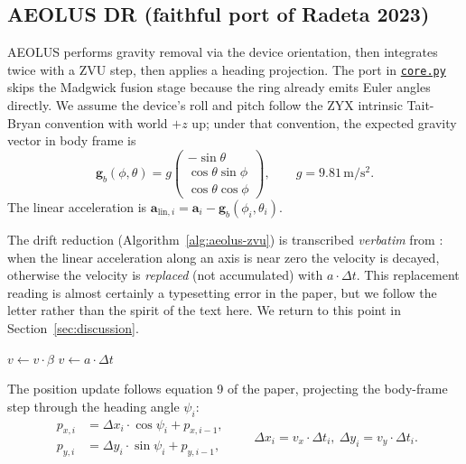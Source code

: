 \documentclass[a4paper,11pt]{article}
\begin{document}
\subsection{AEOLUS DR (faithful port of Radeta 2023)}

AEOLUS performs gravity removal via the device orientation, then integrates
twice with a ZVU step, then applies a heading projection. The port in
\href{../ringbrush_coverage/core.py}{\texttt{core.py}} skips the Madgwick
fusion stage because the ring already emits Euler angles directly. We assume
the device's roll and pitch follow the ZYX intrinsic Tait-Bryan convention
with world $+z$ up; under that convention, the expected gravity vector in
body frame is
\begin{equation}
\mathbf{g}_b(\phi, \theta) = g \begin{pmatrix} -\sin\theta \\ \cos\theta\sin\phi \\ \cos\theta\cos\phi \end{pmatrix},
\qquad g = 9.81\,\mathrm{m/s^2}.
\label{eq:gravity}
\end{equation}
The linear acceleration is $\mathbf{a}_{\mathrm{lin},i} = \mathbf{a}_i -
\mathbf{g}_b(\phi_i, \theta_i)$.

The drift reduction (Algorithm~\ref{alg:aeolus-zvu}) is transcribed
\emph{verbatim} from \cite[Algorithm~1]{radeta2023}: when the linear
acceleration along an axis is near zero the velocity is decayed, otherwise
the velocity is \emph{replaced} (not accumulated) with $a \cdot \Delta t$.
This replacement reading is almost certainly a typesetting error in the
paper, but we follow the letter rather than the spirit of the text here. We
return to this point in Section~\ref{sec:discussion}.

\begin{algorithm}[H]
\caption{AEOLUS drift reduction \cite[Algorithm 1]{radeta2023}, applied per axis.}
\label{alg:aeolus-zvu}
\begin{algorithmic}[1]
 
    \State $v \gets v \cdot \beta$ 
\Else
    \State $v \gets a \cdot \Delta t$ 
\EndIf
\end{algorithmic}
\end{algorithm}

The position update follows equation 9 of the paper, projecting the body-frame
step through the heading angle $\psi_i$:
\begin{equation}
\begin{aligned}
p_{x,i} &= \Delta x_i \cdot \cos\psi_i + p_{x,i-1}, \\
p_{y,i} &= \Delta y_i \cdot \sin\psi_i + p_{y,i-1},
\end{aligned}
\qquad
\Delta x_i = v_x \cdot \Delta t_i,\ \Delta y_i = v_y \cdot \Delta t_i.
\label{eq:eq9}
\end{equation}
\end{document}
